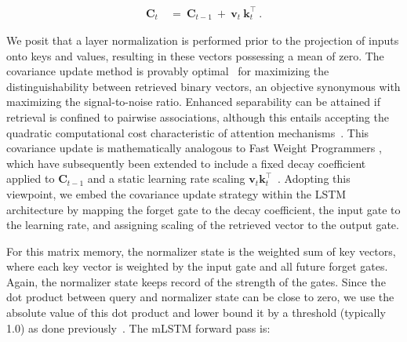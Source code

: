 \begin{align}
\mathbf{C}_t \ &= \ \mathbf{C}_{t-1} \ + \ \mathbf{v}_{t} \ \mathbf{k}_t^\top \ .
\end{align}

We posit that a layer normalization is performed prior to the projection of inputs onto keys and values, resulting in these vectors possessing a mean of zero. The covariance update method is provably optimal~\citep{Dayan:91} for maximizing the distinguishability between retrieved binary vectors, an objective synonymous with maximizing the signal-to-noise ratio. Enhanced separability can be attained if retrieval is confined to pairwise associations, although this entails accepting the quadratic computational cost characteristic of attention mechanisms~\citep{Krotov:16,Krotov:17,Ramsauer:21}. This covariance update is mathematically analogous to Fast Weight Programmers \citep{Schmidhuber:92ncfastweights,Schlag:21}, which have subsequently been extended to include a fixed decay coefficient applied to $\mathbf{C}_{t-1}$ and a static learning rate scaling 
$\mathbf{v}_{t} \mathbf{k}_t ^\top$~\citep{Ba:16}. Adopting this viewpoint, we embed the covariance update strategy within the LSTM architecture by mapping the forget gate to the decay coefficient, the input gate to the learning rate, and assigning scaling of the retrieved vector to the output gate.

For this matrix memory, the normalizer state is the weighted sum of key vectors, where each key vector is weighted by the input gate and all future forget gates. Again, the normalizer state keeps record of the strength of the gates. Since the dot product between query and normalizer state can be close to zero, we use the absolute value of this dot product and lower bound it by a threshold (typically 1.0) as done previously~\citep{Sun:23arxiv}. The mLSTM forward pass is:

